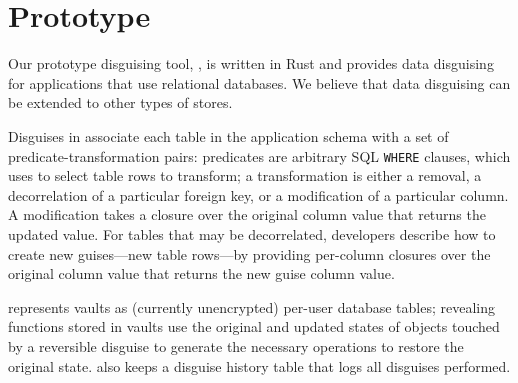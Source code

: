 \section{Prototype}
\label{sec:proto}
%
Our prototype disguising tool, \sys, is written in Rust and 
provides data disguising for applications that use relational databases.
%
We believe that data disguising can be extended to other types of stores.
%

Disguises in \sys associate each table in the application schema with a set of
predicate-transformation pairs: predicates are arbitrary SQL \texttt{WHERE} clauses, which \sys uses
to select table rows to transform; a transformation is either a removal, a decorrelation of a
particular foreign key, or a modification of a particular column. A modification takes a
closure over the original column value that returns the updated value.
%
For tables that may be decorrelated, developers describe how to create new guises---new table
rows---by providing per-column closures over the original column value
that returns the new guise column value.

%
\sys represents vaults as (currently unencrypted) per-user database tables; revealing functions
stored in vaults use the original and updated states of objects touched by a reversible disguise to
generate the necessary operations to restore the original state. \sys also keeps a disguise history
table that logs all disguises performed. 

\iffalse
\sys also provides a specification of the end-state after it applies a sequence of
disguises; this allows developers to double-check that their disguises achieve their privacy
transformation goals.
%
To do so, \sys automatically generates a sequence of materialized view filters that, when applied on top of each
other, correspond to the state achieved by composing the disguises. 
Developers specify assertions (\eg all objects belonging to departing user Bob have
been removed) that \sys ensures holds on the materialized view specification.

\sys's composition technique may reorder filters from one disguise with those from a subsequent disguise in order to achieve the
correct result.
%
\sys maps these filters directly to physical database operations (where reordering filters corresponds to
temporarily undoing vault entries). Thus, the developer can use the materialized view filters as a way to
test the correctness of \sys and their disguises prior to permanently altering the application database. 
\fi
